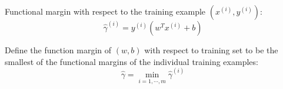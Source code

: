 \documentclass[UTF8]{ctexart}
\begin{document}
	Functional margin with respect to the training example $(x^{(i)}, y^{(i)})$:
	\begin{equation*}
		\hat{\gamma}^{(i)} = y^{(i)}(w^Tx^{(i)} + b)
	\end{equation*}
	
	Define the function margin of $(w, b)$ with respect to training set to be the smallest of the functional margins of the individual training examples:
	\begin{equation*}
		\hat{\gamma} = \min_{i=1,\cdots,m}\hat{\gamma}^{(i)}
	\end{equation*}
	
	
\end{document}
